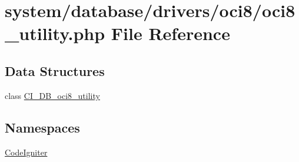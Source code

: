 \hypertarget{oci8__utility_8php}{}\section{system/database/drivers/oci8/oci8\+\_\+utility.php File Reference}
\label{oci8__utility_8php}
\subsection*{Data Structures}
\begin{DoxyCompactItemize}
\item 
class \mbox{\hyperlink{class_c_i___d_b__oci8__utility}{C\+I\+\_\+\+D\+B\+\_\+oci8\+\_\+utility}}
\end{DoxyCompactItemize}
\subsection*{Namespaces}
\begin{DoxyCompactItemize}
\item 
 \mbox{\hyperlink{namespace_code_igniter}{Code\+Igniter}}
\end{DoxyCompactItemize}
